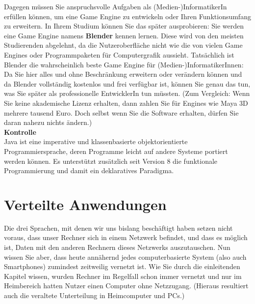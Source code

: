 Dagegen müssen Sie anspruchsvolle Aufgaben als (Medien-)InformatikerIn erfüllen können, um eine Game Engine zu entwickeln oder Ihren Funktionsumfang zu erweitern. In Ihrem Studium können Sie das später ausprobieren: Sie werden eine Game Engine namens \textbf{Blender} kennen lernen. Diese wird von den meisten Studierenden abgelehnt, da die Nutzeroberfläche nicht wie die von vielen Game Engines oder Programmpaketen für Computergrafik aussieht. Tatsächlich ist Blender die wahrscheinlich beste Game Engine für (Medien-)InformatikerInnen: Da Sie hier alles und ohne Beschränkung erweitern oder verändern können und da Blender vollständig kostenlos und frei verfügbar ist, können Sie genau das tun, was Sie später als professionelle EntwicklerIn tun müssten. (Zum Vergleich: Wenn Sie keine akademische Lizenz erhalten, dann zahlen Sie für Engines wie Maya 3D mehrere tausend Euro. Doch selbst wenn Sie die Software erhalten, dürfen Sie daran nahezu nichts ändern.)\\

\textbf{Kontrolle}\\
Java ist eine imperative und klassenbasierte objektorientierte Programmiersprache, deren Programme leicht auf andere Systeme portiert werden können. Es unterstützt zusätzlich seit Version 8 die funktionale Programmierung und damit ein deklaratives Paradigma.

\section{Verteilte Anwendungen}
Die drei Sprachen, mit denen wir uns bislang beschäftigt haben setzen nicht voraus, dass unser Rechner sich in einem Netzwerk befindet, und dass es möglich ist, Daten mit den anderen Rechnern dieses Netzwerks auszutauschen. Nun wissen Sie aber, dass heute annähernd jedes computerbasierte System (also auch Smartphones) zumindest zeitweilig vernetzt ist. Wie Sie durch die einleitenden Kapitel wissen, wurden Rechner im Regelfall schon immer vernetzt und nur im Heimbereich hatten Nutzer einen Computer ohne Netzzugang. (Hieraus resultiert auch die veraltete Unterteilung in Heimcomputer und PCs.)\\

